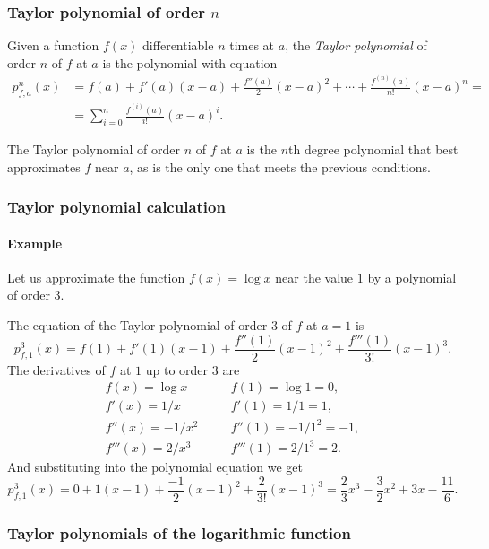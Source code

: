 \begin{frame}
	\frametitle{Taylor polynomial of order $n$}
	\begin{definition}
		Given a function $f(x)$ differentiable $n$ times at $a$, the \emph{Taylor polynomial} of order $n$ of $f$ at $a$ is the polynomial with equation
		\begin{align*}
			p_{f,a}^n(x) & = f(a) + f'(a)(x-a) + \frac{f''(a)}{2}(x-a)^2 + \cdots + \frac{f^{(n)}(a)}{n!}(x-a)^n = \\ 
			             & = \sum_{i=0}^{n}\frac{f^{(i)}(a)}{i!}(x-a)^i.                                           
		\end{align*}
	\end{definition}
	
	The Taylor polynomial of order $n$ of $f$ at $a$ is the $n$th degree polynomial that best approximates $f$ near $a$, as is the only one that meets the previous conditions.
\end{frame} 


\begin{frame}
	\frametitle{Taylor polynomial calculation}
	\framesubtitle{Example}
	Let us approximate the function $f(x)=\log x$ near the value $1$ by a polynomial of order $3$.
	
	The equation of the Taylor polynomial of order $3$ of $f$ at $a=1$ is
	\[
		p_{f,1}^3(x)=f(1)+f'(1)(x-1)+\frac{f''(1)}{2}(x-1)^2+\frac{f'''(1)}{3!}(x-1)^3.
	\]
	The derivatives of $f$ at $1$ up to order $3$ are
	\[
		\begin{array}{lll}
			f(x)=\log x   & \quad & f(1)=\log 1 =0,   \\
			f'(x)=1/x     &       & f'(1)=1/1=1,      \\
			f''(x)=-1/x^2 &       & f''(1)=-1/1^2=-1, \\
			f'''(x)=2/x^3 &       & f'''(1)=2/1^3=2.  
		\end{array}
	\]
	And substituting into the polynomial equation we get
	\[
		p_{f,1}^3(x)=0+1(x-1)+\frac{-1}{2}(x-1)^2+\frac{2}{3!}(x-1)^3= \frac{2}{3}x^3-\frac{3}{2}x^2+3x-\frac{11}{6}.
	\]
\end{frame}


\begin{frame}
	\frametitle{Taylor polynomials of the logarithmic function}
	\begin{center}
		
	\end{center}
\end{frame}


